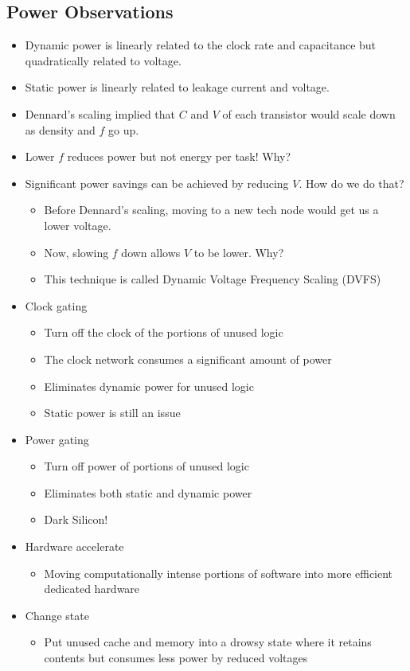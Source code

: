 \documentclass[11pt]{article}
\begin{document}
\subsection{Power Observations}
\begin{itemize}
    \item Dynamic power is linearly related to the clock rate and capacitance but quadratically related to voltage.
    \item Static power is linearly related to leakage current and voltage.
    \item Dennard's scaling implied that \(C\) and \(V\) of each transistor would scale down as density and \(f\) go up.
    \item Lower \(f\) reduces power but not energy per task! Why?
    \item Significant power savings can be achieved by reducing \(V\). How do we do that?
    \begin{itemize}
        \item Before Dennard's scaling, moving to a new tech node would get us a lower voltage.
        \item Now, slowing \(f\) down allows \(V\) to be lower. Why?
        \item This technique is called Dynamic Voltage Frequency Scaling (DVFS)
    \end{itemize}
    \item Clock gating
    \begin{itemize}
        \item Turn off the clock of the portions of unused logic
        \item The clock network consumes a significant amount of power
        \item Eliminates dynamic power for unused logic
        \item Static power is still an issue
    \end{itemize}
    \item Power gating
    \begin{itemize}
        \item Turn off power of portions of unused logic
        \item Eliminates both static and dynamic power
        \item Dark Silicon!
    \end{itemize}
    \item Hardware accelerate
    \begin{itemize}
        \item Moving computationally intense portions of software into more efficient dedicated hardware
    \end{itemize}
    \item Change state
    \begin{itemize}
        \item Put unused cache and memory into a drowsy state where it retains contents but consumes less power by reduced voltages
    \end{itemize}
\end{itemize}
\end{document}
